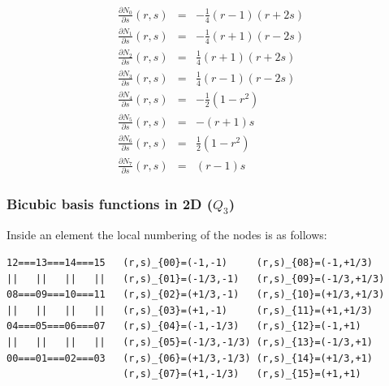 \begin{mdframed}[backgroundcolor=blue!5]
\begin{eqnarray}
\frac{\partial N_0}{\partial s}(r,s)&=& -\frac{1}{4}(r-1)(r+2s) \\
\frac{\partial N_1}{\partial s}(r,s)&=& -\frac{1}{4}(r+1)(r-2s) \\
\frac{\partial N_2}{\partial s}(r,s)&=&  \frac{1}{4}(r+1)(r+2s) \\
\frac{\partial N_3}{\partial s}(r,s)&=&  \frac{1}{4}(r-1)(r-2s) \\
\frac{\partial N_4}{\partial s}(r,s)&=& - \frac{1}{2}(1-r^2)\\
\frac{\partial N_5}{\partial s}(r,s)&=&  -(r+1)s \\
\frac{\partial N_6}{\partial s}(r,s)&=& \frac{1}{2} (1-r^2)\\
\frac{\partial N_7}{\partial s}(r,s)&=&  (r-1)s
\end{eqnarray}
\end{mdframed}

























\subsubsection{Bicubic basis functions in 2D ($Q_3$)}

Inside an element the local numbering of the nodes is as follows:
\begin{verbatim}
12===13===14===15   (r,s)_{00}=(-1,-1)     (r,s)_{08}=(-1,+1/3)  
||   ||   ||   ||   (r,s)_{01}=(-1/3,-1)   (r,s)_{09}=(-1/3,+1/3)
08===09===10===11   (r,s)_{02}=(+1/3,-1)   (r,s)_{10}=(+1/3,+1/3)
||   ||   ||   ||   (r,s)_{03}=(+1,-1)     (r,s)_{11}=(+1,+1/3)
04===05===06===07   (r,s)_{04}=(-1,-1/3)   (r,s)_{12}=(-1,+1)
||   ||   ||   ||   (r,s)_{05}=(-1/3,-1/3) (r,s)_{13}=(-1/3,+1)
00===01===02===03   (r,s)_{06}=(+1/3,-1/3) (r,s)_{14}=(+1/3,+1)
                    (r,s)_{07}=(+1,-1/3)   (r,s)_{15}=(+1,+1)
\end{verbatim}

